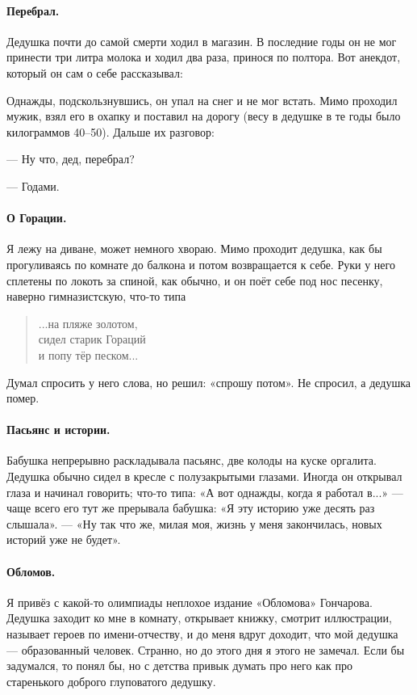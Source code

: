 \documentclass{book}
\begin{document}
\paragraph{Перебрал.}
Дедушка почти до самой смерти ходил в магазин.
В последние годы он не мог принести три литра молока и ходил два раза, принося по полтора.
Вот анекдот, который он сам о себе рассказывал:

Однажды, подскользнувшись, он упал на снег и не мог встать.
Мимо проходил мужик, взял его в охапку и поставил на дорогу (весу в дедушке в те годы было килограммов 40--50).
Дальше их разговор:

--- Ну что, дед, перебрал?

--- Годами.

\paragraph{О Горации.}
Я лежу на диване, может немного хвораю.
Мимо проходит дедушка, как бы прогуливаясь по комнате до балкона и потом возвращается к себе.
Руки у него сплетены по локоть за спиной, как обычно, и
он поёт себе под нос песенку, наверно гимназистскую, что-то типа 
\begin{verse}
...на пляже золотом,\\
сидел старик Гораций\\
и попу тёр песком...
\end{verse}
Думал спросить у него слова, но решил: «спрошу потом».
Не спросил, а дедушка помер.

\paragraph{Пасьянс и истории.}
Бабушка непрерывно раскладывала пасьянс, две колоды на куске оргалита.
Дедушка обычно сидел в кресле с полузакрытыми глазами.
Иногда он открывал глаза и начинал говорить;
что-то типа: «А вот однажды, когда я работал в...» --- чаще всего его тут же прерывала бабушка: «Я эту историю уже десять раз слышала». --- «Ну так что же, милая моя, жизнь у меня закончилась, новых историй уже не будет».

\paragraph{Обломов.}
Я привёз с какой-то олимпиады неплохое издание «Обломова» Гончарова.
Дедушка заходит ко мне в комнату, открывает книжку, смотрит иллюстрации, называет героев по имени-отчеству, и до меня вдруг доходит, что мой дедушка --- образованный человек.
Странно, но до этого дня я этого не замечал.
Если бы задумался, то понял бы, но с детства привык думать про него как про старенького доброго глуповатого дедушку.
\end{document}
